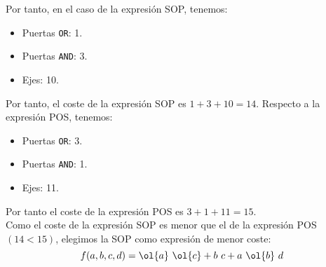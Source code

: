 \documentclass[12pt]{article}
\begin{document}
\begin{ejercicio}
        Por tanto, en el caso de la expresión SOP, tenemos:
        \begin{itemize}
            \item Puertas \verb|OR|: 1.
            \item Puertas \verb|AND|: 3.
            \item Ejes: 10.
        \end{itemize}
        Por tanto, el coste de la expresión SOP es $1+3+10=14$.
        Respecto a la expresión POS, tenemos:
        \begin{itemize}
            \item Puertas \verb|OR|: 3.
            \item Puertas \verb|AND|: 1.
            \item Ejes: 11.
        \end{itemize}
        Por tanto el coste de la expresión POS es $3+1+11=15$.\\

        Como el coste de la expresión SOP es menor que el de la expresión POS $(14 < 15)$, elegimos la SOP como expresión de menor coste:
        \begin{equation*}
            f(a, b, c, d) = \ol{a}~\ol{c} + b~c + a~\ol{b}~d
        \end{equation*}
        
    \end{ejercicio}
\end{document}
